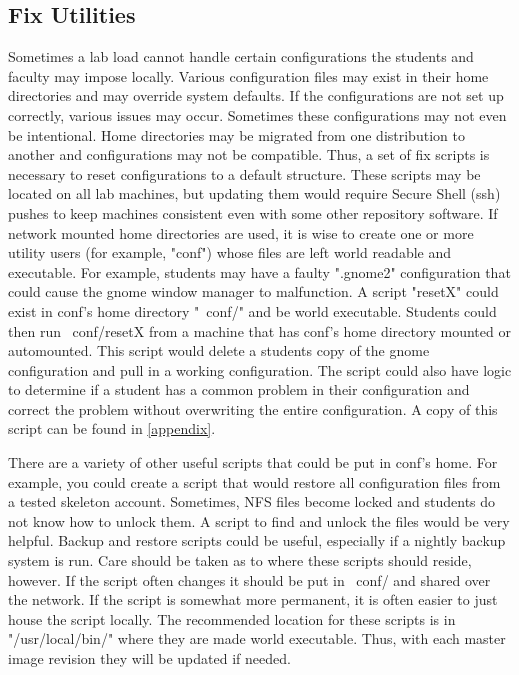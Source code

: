 \subsection{Fix Utilities}

Sometimes a lab load cannot handle certain configurations the students and faculty may impose locally.  Various configuration files may exist in their home directories and may override system defaults.  If the configurations are not set up correctly, various issues may occur.  Sometimes these configurations may not even be intentional.  Home directories may be migrated from one distribution to another and configurations may not be compatible.  Thus, a set of fix scripts is necessary to reset configurations to a default structure.  These scripts may be located on all lab machines, but updating them would require Secure Shell (ssh) pushes to keep machines consistent even with some other repository software.  If network mounted home directories are used, it is wise to create one or more utility users (for example, "conf") whose files are left world readable and executable.  For example, students may have a faulty ".gnome2" configuration that could cause the gnome window manager to malfunction.  A script "resetX" could exist in conf's home directory "~conf/" and be world executable.  Students could then run ~conf/resetX from a machine that has conf's home directory mounted or automounted.  This script would delete a students copy of the gnome configuration and pull in a working configuration.  The script could also have logic to determine if a student has a common problem in their configuration and correct the problem without overwriting the entire configuration.  A copy of this script can be found in \ref{appendix}. 

There are a variety of other useful scripts that could be put in conf's home.  For example, you could create a script that would restore all configuration files from a tested skeleton account.  Sometimes, NFS files become locked and students do not know how to unlock them.  A script to find and unlock the files would be very helpful.  Backup and restore scripts could be useful, especially if a nightly backup system is run.  Care should be taken as to where these scripts should reside, however.  If the script often changes it should be put in ~conf/ and shared over the network.  If the script is somewhat more permanent, it is often easier to just house the script locally.  The recommended location for these scripts is in "/usr/local/bin/" where they are made world executable.  Thus, with each master image revision they will be updated if needed.  
